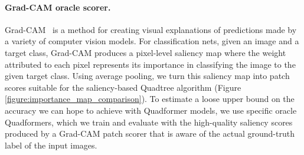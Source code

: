 \paragraph{Grad-CAM oracle scorer.}\label{paragraph:oracle_scorer}
Grad-CAM~\cite{Selvaraju2016GradCAMVE} is a method for creating visual explanations of predictions made by a variety of computer vision models. For classification nets, given an image and a target class, Grad-CAM produces a pixel-level saliency map where the weight attributed to each pixel represents its importance in classifying the image to the given target class. Using average pooling, we turn this saliency map into patch scores suitable for the saliency-based Quadtree algorithm (Figure \ref{figure:importance_map_comparison}). To estimate a loose upper bound on the accuracy we can hope to achieve with Quadformer models, we use specific oracle Quadformers, which we train and evaluate with the high-quality saliency scores produced by a Grad-CAM patch scorer that is aware of the actual ground-truth label of the input images.
